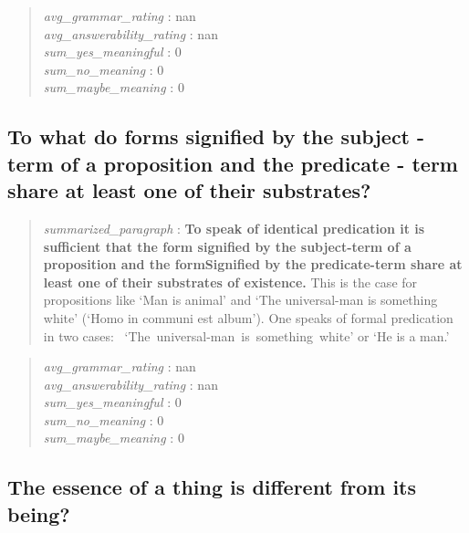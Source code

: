 \begin{quote}
\emph{avg\_grammar\_rating} : nan\\
\emph{avg\_answerability\_rating} : nan\\
\emph{sum\_yes\_meaningful} : 0\\
\emph{sum\_no\_meaning} : 0\\
\emph{sum\_maybe\_meaning} : 0
\end{quote}

\hypertarget{to-what-do-forms-signified-by-the-subject---term-of-a-proposition-and-the-predicate---term-share-at-least-one-of-their-substrates}{%
\subsection{To what do forms signified by the subject - term of a
proposition and the predicate - term share at least one of their
substrates?}\label{to-what-do-forms-signified-by-the-subject---term-of-a-proposition-and-the-predicate---term-share-at-least-one-of-their-substrates}}

\begin{quote}
\emph{summarized\_paragraph} : \textbf{To speak of identical predication
it is sufficient that the form signified by the subject-term of a
proposition and the formSignified by the predicate-term share at least
one of their substrates of existence.} This is the case for propositions
like `Man is animal' and `The universal-man is something white' (`Homo
in communi est album'). One speaks of formal predication in two cases:
~`The~universal-man~is~something~white' or `He is a man.'
\end{quote}

\begin{quote}
\emph{avg\_grammar\_rating} : nan\\
\emph{avg\_answerability\_rating} : nan\\
\emph{sum\_yes\_meaningful} : 0\\
\emph{sum\_no\_meaning} : 0\\
\emph{sum\_maybe\_meaning} : 0
\end{quote}

\hypertarget{the-essence-of-a-thing-is-different-from-its-being}{%
\subsection{The essence of a thing is different from its
being?}\label{the-essence-of-a-thing-is-different-from-its-being}}


